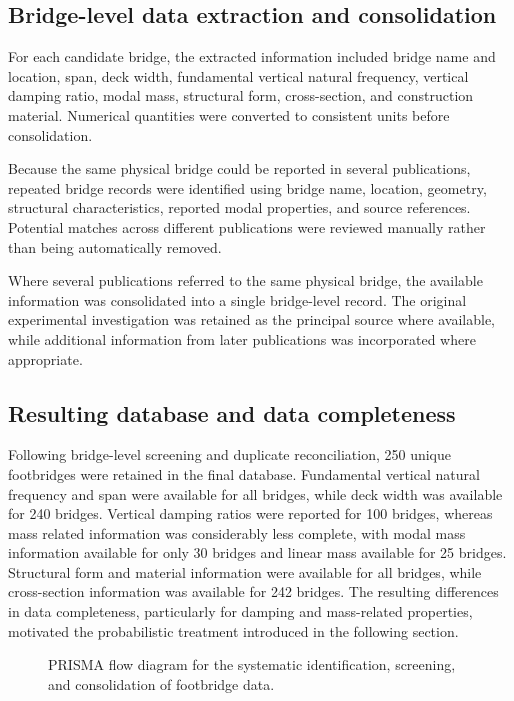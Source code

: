 \documentclass[preprint,a4paper,12pt]{elsarticle}
\begin{document}
\subsection{Bridge-level data extraction and consolidation}

For each candidate bridge, the extracted information included bridge name and location, span, deck width, fundamental vertical natural frequency, vertical damping ratio, modal mass, structural form, cross-section, and construction material. 
Numerical quantities were converted to consistent units before consolidation.

Because the same physical bridge could be reported in several publications, repeated bridge records were identified using bridge name, location, geometry, structural characteristics, reported modal properties, and source references. 
Potential matches across different publications were reviewed manually rather than being automatically removed.

Where several publications referred to the same physical bridge, the available information was consolidated into a single bridge-level record. 
The original experimental investigation was retained as the principal source where available, while additional information from later publications was incorporated where appropriate.

\subsection{Resulting database and data completeness}

Following bridge-level screening and duplicate reconciliation, 250 unique footbridges were retained in the final database.
Fundamental vertical natural frequency and span were available for all bridges, while deck width was available for 240 bridges.
Vertical damping ratios were reported for 100 bridges, whereas mass related information was considerably less complete, with modal mass information available for only 30 bridges and linear mass available for 25 bridges.
Structural form and material information were available for all bridges, while cross-section information was available for 242 bridges.
The resulting differences in data completeness, particularly for damping and mass-related properties, motivated the probabilistic treatment introduced in the following section.

\begin{figure}[htbp]
    \centering
    \resizebox{0.5\textwidth}{!}{}
    \caption{PRISMA flow diagram for the systematic identification, screening, and consolidation of footbridge data.}
    \label{fig:prisma_flow}
\end{figure}
\end{document}
